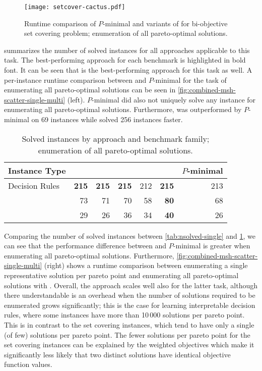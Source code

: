 \begin{figure}
  \centering
  \texttt{[image: setcover-cactus.pdf]}
  \caption{Runtime comparison of $P$-minimal and variants of \algname{} for bi-objective set covering problem;
    enumeration of all pareto-optimal solutions.
  }\label{fig:setcover-cactus-multi}
\end{figure}

 summarizes the number of solved instances for all approaches applicable to this task.
The best-performing approach for each benchmark is highlighted in bold font.
It can be seen that \msh{} is the best-performing approach for this task as well.
A per-instance runtime comparison between \msh{} and $P$-minimal for the task of enumerating all pareto-optimal solutions can be seen in \cref{fig:combined-msh-scatter-single-multi} (left).
$P$-minimal did also not uniquely solve any instance for enumerating all pareto-optimal solutions.
Furthermore, \msh{} was outperformed by $P$-minimal on 69 instances while \msh{} solved 256 instances faster.

\begin{table}
  \centering
  \caption{Solved instances by approach and benchmark family;
    enumeration of all pareto-optimal solutions.
  }\label{tab:nsolved-multi}
  \begin{tabular}{@{}lrrrrrr@{}}
    \toprule
    Instance Type & \satunsat{} & \unsatsat{} & \msu{} & \oll{} & \msh{} & $P$-minimal \\
    \midrule
    Decision Rules & \textbf{215} & \textbf{215} & \textbf{215} & 212 & \textbf{215} & 213 \\
    \scep{} & 73 & 71 & 70 & 58 & \textbf{80} & 68 \\
    \scsc{} & 29 & 26 & 36 & 34 & \textbf{40} & 26 \\
    \bottomrule
  \end{tabular}
\end{table}

Comparing the number of solved instances between \cref{tab:nsolved-single} and \cref{tab:nsolved-multi}, we can see that the performance difference between \algname{} and $P$-minimal is greater when enumerating all pareto-optimal solutions.
Furthermore, \cref{fig:combined-msh-scatter-single-multi} (right) shows a runtime comparison between enumerating a single representative solution per pareto point and enumerating all pareto-optimal solutions with \msh{}.
Overall, the approach scales well also for the latter task, although there understandable is an overhead when the number of solutions required to be enumerated grows significantly;
this is the case for learning interpretable decision rules, where some instances have more than 10\,000 solutions per pareto point.
This is in contrast to the set covering instances, which tend to have only a single (of few) solutions per pareto point.
The fewer solutions per pareto point for the set covering instances can be explained by the weighted objectives which make it significantly less likely that two distinct solutions have identical objective function values.

